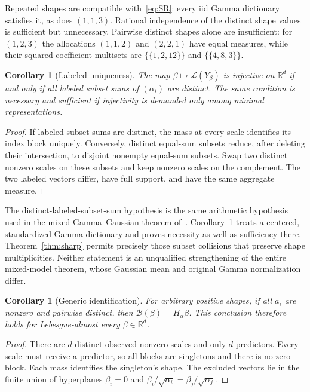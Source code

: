 \documentclass[11pt]{article}
\newtheorem{corollary}[theorem]{Corollary}
\theoremstyle{definition}\newtheorem{definition}[theorem]{Definition}
\theoremstyle{remark}\newtheorem{remark}[theorem]{Remark}
\newcommand{\R}{\mathbb R}
\newcommand{\Law}{\mathcal L}
\newcommand{\B}{\mathcal B}
\newcommand{\multiset}[1]{\{\!\{#1\}\!\}}
\begin{document}
Repeated shapes are compatible with~\eqref{eq:SR}: every iid Gamma dictionary satisfies it, as does $(1,1,3)$. Rational independence of the distinct shape values is sufficient but unnecessary. Pairwise distinct shapes alone are insufficient: for $(1,2,3)$ the allocations $(1,1,2)$ and $(2,2,1)$ have equal measures, while their squared coefficient multisets are $\multiset{1,2,12}$ and $\multiset{4,8,3}$.

\begin{corollary}[Labeled uniqueness]\label{cor:labeled}
The map $\beta\mapsto\Law(Y_\beta)$ is injective on $\R^d$ if and only if all labeled subset sums of $(\alpha_i)$ are distinct. The same condition is necessary and sufficient if injectivity is demanded only among minimal representations.
\end{corollary}
\begin{proof}
If labeled subset sums are distinct, the mass at every scale identifies its index block uniquely. Conversely, distinct equal-sum subsets reduce, after deleting their intersection, to disjoint nonempty equal-sum subsets. Swap two distinct nonzero scales on these subsets and keep nonzero scales on the complement. The two labeled vectors differ, have full support, and have the same aggregate measure.
\end{proof}

The distinct-labeled-subset-sum hypothesis is the same arithmetic hypothesis used in the mixed Gamma--Gaussian theorem of~\cite[Theorem~5]{BSS}. Corollary~\ref{cor:labeled} treats a centered, standardized Gamma dictionary and proves necessity as well as sufficiency there. Theorem~\ref{thm:sharp} permits precisely those subset collisions that preserve shape multiplicities. Neither statement is an unqualified strengthening of the entire mixed-model theorem, whose Gaussian mean and original Gamma normalization differ.

\begin{corollary}[Generic identification]\label{cor:generic}
For arbitrary positive shapes, if all $a_i$ are nonzero and pairwise distinct, then $\B(\beta)=H_\alpha\beta$. This conclusion therefore holds for Lebesgue-almost every $\beta\in\R^d$.
\end{corollary}
\begin{proof}
There are $d$ distinct observed nonzero scales and only $d$ predictors. Every scale must receive a predictor, so all blocks are singletons and there is no zero block. Each mass identifies the singleton's shape. The excluded vectors lie in the finite union of hyperplanes $\beta_i=0$ and $\beta_i/\sqrt{\alpha_i}=\beta_j/\sqrt{\alpha_j}$.
\end{proof}
\end{document}
